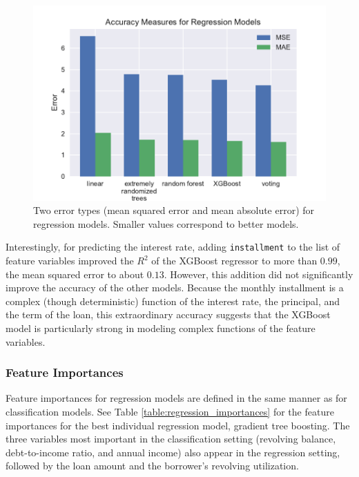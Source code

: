 \documentclass[12pt]{article}
\begin{document}
\begin{figure}[!htbp]
    \centering
    \includegraphics[width=\textwidth]{graphics/regression_errors}
    \caption{Two error types (mean squared error and mean absolute error) for regression models. Smaller values correspond to better models.}
    \label{fig:regression_errors}
\end{figure}

Interestingly, for predicting the interest rate, adding \texttt{installment} to the list of feature variables improved the $R^2$ of the XGBoost regressor to more than $0.99$, the mean squared error to about $0.13$. However, this addition did not significantly improve the accuracy of the other models. Because the monthly installment is a complex (though deterministic) function of the interest rate, the principal, and the term of the loan, this extraordinary accuracy suggests that the XGBoost model is particularly strong in modeling complex functions of the feature variables.

\subsubsection{Feature Importances}

Feature importances for regression models are defined in the same manner as for classification models. See Table \ref{table:regression_importances} for the feature importances for the best individual regression model, gradient tree boosting. The three variables most important in the classification setting (revolving balance, debt-to-income ratio, and annual income) also appear in the regression setting, followed by the loan amount and the borrower's revolving utilization. 
\end{document}
